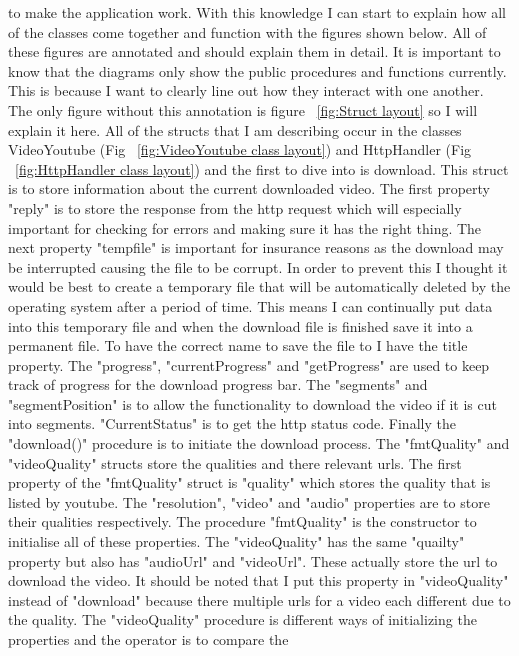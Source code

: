 \documentclass{article}
\begin{document}
to make the application work.
With this knowledge I can start to explain how all of the classes come together and
function with the figures shown below. All of these figures are annotated and should
explain them in detail. It is important to know that the diagrams only show the
public procedures and functions currently. This is because I want to clearly line
out how they interact with one another. The only figure without this annotation is
figure ~\ref{fig:Struct layout} so I will explain it here. All of the structs that I
am describing occur in the classes VideoYoutube (Fig ~\ref{fig:VideoYoutube class layout})
and HttpHandler (Fig ~\ref{fig:HttpHandler class layout}) and the first to dive into is
download. This struct is to store information about the current downloaded video. The
first property "reply" is to store the response from the http request which will
especially important for checking for errors and making sure it has the right thing. The
next property "tempfile" is important for insurance reasons as the download may be
interrupted causing the file to be corrupt. In order to prevent this I thought it would
be best to create a temporary file that will be automatically deleted by the operating
system after a period of time. This means I can continually put data into this temporary
file and when the download file is finished save it into a permanent file. To have the
correct name to save the file to I have the title property. The "progress",
"currentProgress" and "getProgress" are used to keep track of progress for the download
progress bar. The "segments" and "segmentPosition" is to allow the functionality to
download the video if it is cut into segments. "CurrentStatus" is to get the http status
code. Finally the "download()" procedure is to initiate the download process.
The "fmtQuality" and "videoQuality" structs store the qualities and there relevant
urls. The first property of the "fmtQuality" struct is "quality" which stores the quality
that is listed by youtube. The "resolution", "video" and "audio" properties are to store
their qualities respectively. The procedure "fmtQuality" is the constructor to initialise
all of these properties. The "videoQuality" has the same "quailty" property but also has
"audioUrl" and "videoUrl". These actually store the url to download the video. It should be
noted that I put this property in "videoQuality" instead of "download" because there
multiple urls for a video each different due to the quality. The "videoQuality" procedure
is different ways of initializing the properties and the operator is to compare the
\end{document}
